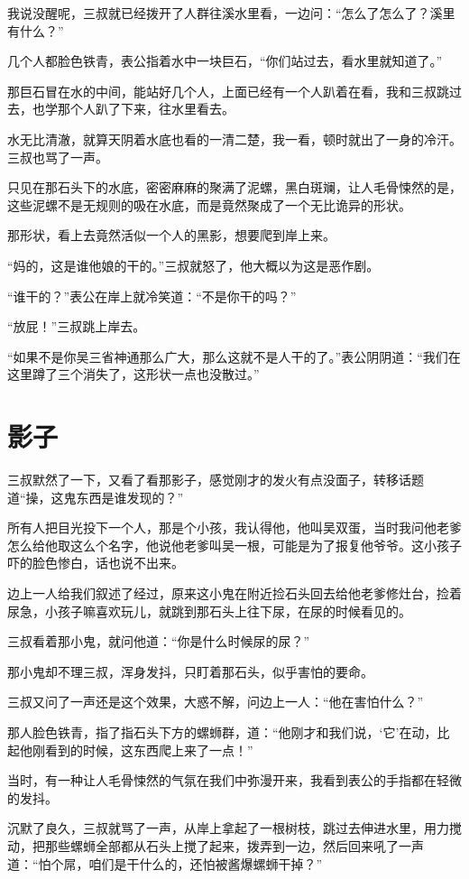 我说没醒呢，三叔就已经拨开了人群往溪水里看，一边问：“怎么了怎么了？溪里有什么？”

几个人都脸色铁青，表公指着水中一块巨石，“你们站过去，看水里就知道了。”

那巨石冒在水的中间，能站好几个人，上面已经有一个人趴着在看，我和三叔跳过去，也学那个人趴了下来，往水里看去。

水无比清澈，就算天阴着水底也看的一清二楚，我一看，顿时就出了一身的冷汗。三叔也骂了一声。

只见在那石头下的水底，密密麻麻的聚满了泥螺，黑白斑斓，让人毛骨悚然的是，这些泥螺不是无规则的吸在水底，而是竟然聚成了一个无比诡异的形状。

那形状，看上去竟然活似一个人的黑影，想要爬到岸上来。

“妈的，这是谁他娘的干的。”三叔就怒了，他大概以为这是恶作剧。

“谁干的？”表公在岸上就冷笑道：“不是你干的吗？”

“放屁！”三叔跳上岸去。

“如果不是你吴三省神通那么广大，那么这就不是人干的了。”表公阴阴道：“我们在这里蹲了三个消失了，这形状一点也没散过。”

\chapter{影子}

三叔默然了一下，又看了看那影子，感觉刚才的发火有点没面子，转移话题道“操，这鬼东西是谁发现的？”

所有人把目光投下一个人，那是个小孩，我认得他，他叫吴双蛋，当时我问他老爹怎么给他取这么个名字，他说他老爹叫吴一根，可能是为了报复他爷爷。这小孩子吓的脸色惨白，话也说不出来。

边上一人给我们叙述了经过，原来这小鬼在附近捡石头回去给他老爹修灶台，捡着尿急，小孩子嘛喜欢玩儿，就跳到那石头上往下尿，在尿的时候看见的。

三叔看着那小鬼，就问他道：“你是什么时候尿的尿？”

那小鬼却不理三叔，浑身发抖，只盯着那石头，似乎害怕的要命。

三叔又问了一声还是这个效果，大惑不解，问边上一人：“他在害怕什么？”

那人脸色铁青，指了指石头下方的螺蛳群，道：“他刚才和我们说，‘它’在动，比起他刚看到的时候，这东西爬上来了一点！”

当时，有一种让人毛骨悚然的气氛在我们中弥漫开来，我看到表公的手指都在轻微的发抖。

沉默了良久，三叔就骂了一声，从岸上拿起了一根树枝，跳过去伸进水里，用力搅动，把那些螺蛳全部都从石头上搅了起来，拨弄到一边，然后回来吼了一声道：“怕个屌，咱们是干什么的，还怕被酱爆螺蛳干掉？”

